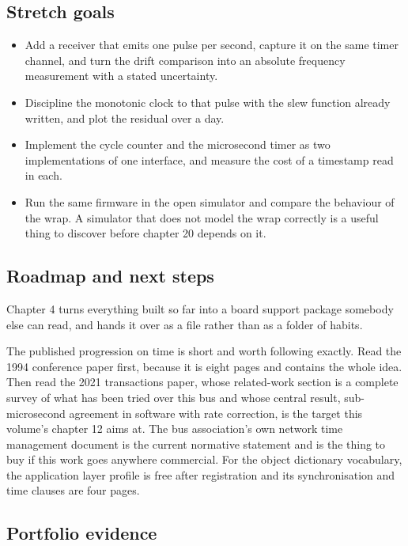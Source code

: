 \subsection*{Stretch goals}

\begin{itemize}
\item Add a receiver that emits one pulse per second, capture it on the same
timer channel, and turn the drift comparison into an absolute frequency
measurement with a stated uncertainty.
\item Discipline the monotonic clock to that pulse with the slew function
already written, and plot the residual over a day.
\item Implement the cycle counter and the microsecond timer as two
implementations of one interface, and measure the cost of a timestamp read in
each.
\item Run the same firmware in the open simulator and compare the behaviour of
the wrap. A simulator that does not model the wrap correctly is a useful thing
to discover before chapter 20 depends on it.
\end{itemize}

\subsection*{Roadmap and next steps}

Chapter 4 turns everything built so far into a board support package somebody
else can read, and hands it over as a file rather than as a folder of habits.

The published progression on time is short and worth following exactly. Read the
1994 conference paper first, because it is eight pages and contains the whole
idea. Then read the 2021 transactions paper, whose related-work section is a
complete survey of what has been tried over this bus and whose central result,
sub-microsecond agreement in software with rate correction, is the target this
volume's chapter 12 aims at. The bus association's own network time management
document is the current normative statement and is the thing to buy if this
work goes anywhere commercial. For the object dictionary vocabulary, the
application layer profile is free after registration and its synchronisation and
time clauses are four pages.

\subsection*{Portfolio evidence}

